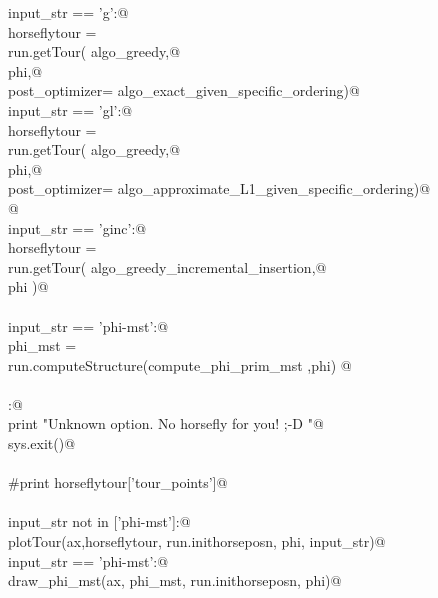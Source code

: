 \documentclass[11.5pt]{report}
\begin{document}
\begin{flushleft}
\begin{list}{}{}
\mbox{}\verb@elif input_str == 'g':@\\
\mbox{}\verb@      horseflytour = \@\\
\mbox{}\verb@             run.getTour( algo_greedy,@\\
\mbox{}\verb@                          phi,@\\
\mbox{}\verb@                          post_optimizer= algo_exact_given_specific_ordering)@\\
\mbox{}\verb@elif input_str == 'gl':@\\
\mbox{}\verb@      horseflytour = \@\\
\mbox{}\verb@             run.getTour( algo_greedy,@\\
\mbox{}\verb@                          phi,@\\
\mbox{}\verb@                          post_optimizer= algo_approximate_L1_given_specific_ordering)@\\
\mbox{}\verb@                          @\\
\mbox{}\verb@elif input_str == 'ginc':@\\
\mbox{}\verb@      horseflytour = \@\\
\mbox{}\verb@             run.getTour( algo_greedy_incremental_insertion,@\\
\mbox{}\verb@                          phi )@\\
\mbox{}\verb@@\\
\mbox{}\verb@elif input_str == 'phi-mst':@\\
\mbox{}\verb@      phi_mst = \@\\
\mbox{}\verb@             run.computeStructure(compute_phi_prim_mst ,phi)     @\\
\mbox{}\verb@@\\
\mbox{}\verb@else:@\\
\mbox{}\verb@      print "Unknown option. No horsefly for you! ;-D "@\\
\mbox{}\verb@      sys.exit()@\\
\mbox{}\verb@@\\
\mbox{}\verb@#print horseflytour['tour_points']@\\
\mbox{}\verb@@\\
\mbox{}\verb@if input_str not in ['phi-mst']:@\\
\mbox{}\verb@     plotTour(ax,horseflytour, run.inithorseposn, phi, input_str)@\\
\mbox{}\verb@elif input_str == 'phi-mst':@\\
\mbox{}\verb@     draw_phi_mst(ax, phi_mst, run.inithorseposn, phi)@\\

\end{list}
\end{flushleft}
\end{document}
